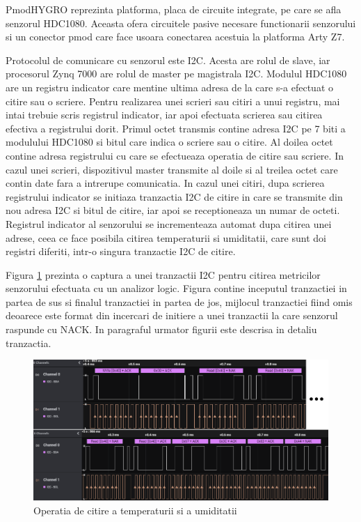 PmodHYGRO reprezinta platforma, placa de circuite integrate, pe care se afla senzorul HDC1080. Aceasta ofera circuitele pasive necesare functionarii senzorului si 
un conector pmod care face usoara conectarea acestuia la platforma Arty Z7.

Protocolul de comunicare cu senzorul este I2C. Acesta are rolul de slave, iar procesorul Zynq 7000 are rolul de master pe magistrala I2C. Modulul HDC1080 are un 
registru indicator care mentine ultima adresa de la care s-a efectuat o citire sau o scriere. Pentru realizarea unei scrieri sau citiri a unui registru, mai intai 
trebuie scris registrul indicator, iar apoi efectuata scrierea sau citirea efectiva a registrului dorit. Primul octet transmis contine adresa I2C pe 7 biti a 
modulului HDC1080 si bitul care indica o scriere sau o citire. Al doilea octet contine adresa registrului cu care se efectueaza operatia de citire sau scriere. 
In cazul unei scrieri, dispozitivul master transmite al doile si al treilea octet care contin date fara a intrerupe comunicatia. In cazul unei citiri, dupa scrierea 
registrului indicator se initiaza tranzactia I2C de citire in care se transmite din nou adresa I2C si bitul de citire, iar apoi se receptioneaza un numar de octeti. 
Registrul indicator al senzorului se incrementeaza automat dupa citirea unei adrese, ceea ce face posibila citirea temperaturii si umiditatii, care sunt doi registri 
diferiti, intr-o singura tranzactie I2C de citire.

Figura \ref{fig:PI_HDC1080ReadOperation} prezinta o captura a unei tranzactii I2C pentru citirea metricilor senzorului efectuata cu un analizor logic. Figura contine 
inceputul tranzactiei in partea de sus si finalul tranzactiei in partea de jos, mijlocul tranzactiei fiind omis deoarece este format din incercari de initiere a unei 
tranzactii la care senzorul raspunde cu NACK. In paragraful urmator figurii este descrisa in detaliu tranzactia.
\begin{figure}[H]
    \centering
    \includegraphics[scale=0.55]{figs/PI_HDC1080ReadOperation.png}
    \caption{Operatia de citire a temperaturii si a umiditatii}
    \label{fig:PI_HDC1080ReadOperation}
\end{figure}

